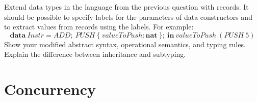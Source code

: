 \documentclass[10pt,a4paper]{exam} %
\begin{document}
\begin{questions}
\question[10] Extend data types in the language from the previous question with records. It should be possible to specify labels for the parameters of data constructors and to extract values from records using the labels. For example:
\begin{displaymath}
\mathbf{data}~\mathit{Instr} = \mathit{ADD};~\mathit{PUSH}~\{~\mathit{valueToPush} : \mathbf{nat}~\};~\mathbf{in}~\mathit{valueToPush}~(\mathit{PUSH}~5)
\end{displaymath}
Show your modified abstract syntax, operational semantics, and typing rules. \droppoints 
\question[2] Explain the difference between inheritance and subtyping. \droppoints 

\section*{Concurrency}

\newcommand{\receive}[2]{#1(#2)}
\newcommand{\send}[2]{\overline{#1}\langle #2 \rangle}
\newcommand{\channel}[1]{(\nu #1)}


\end{questions}
\end{document}
